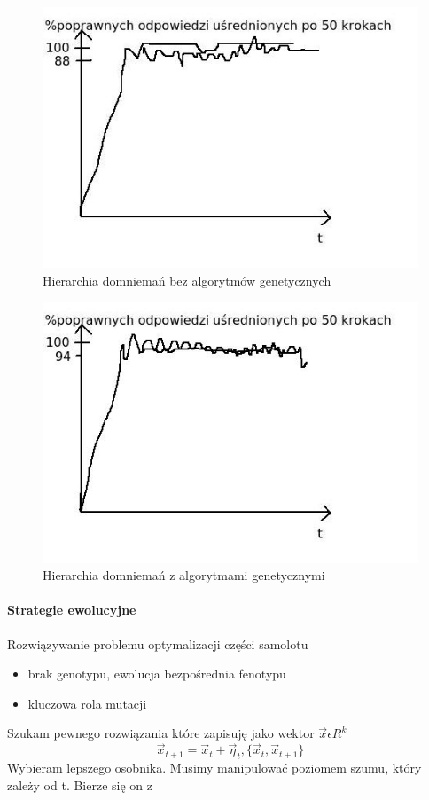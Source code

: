 \documentclass{article}
\begin{document}
		\begin{figure}[ht]
			\label{fig:fig2}
			\centering
			\includegraphics[scale=0.5]{bezalgen.jpeg}
			\caption{Hierarchia domniemań bez algorytmów genetycznych}
		\end{figure}
		
		\begin{figure}[ht]
			\label{fig:fig2}
			\centering
			\includegraphics[scale=0.5]{algenhier.jpeg}
			\caption{Hierarchia domniemań z algorytmami genetycznymi}
		\end{figure}
	 
		\paragraph{Strategie ewolucyjne} Rozwiązywanie problemu optymalizacji części samolotu 
		\begin{itemize}
			\item brak genotypu, ewolucja bezpośrednia fenotypu
			\item kluczowa rola mutacji
		\end{itemize}
		 Szukam pewnego rozwiązania które zapisuję jako wektor $\vec{x}\epsilon R^k$
		 $$\vec{x}_{t+1} = \vec{x}_t + \vec{\eta}_t, \{\vec{x}_t, \vec{x}_{t+1}\}$$
		Wybieram lepszego osobnika. Musimy manipulować poziomem szumu, który zależy od t. Bierze się on z 
\end{document}
